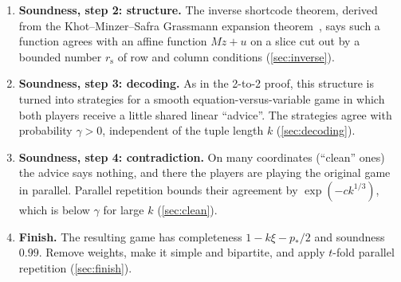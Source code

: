 \documentclass[11pt]{article}
\theoremstyle{definition}
\theoremstyle{remark}
\newcommand{\rs}{r_{\mathrm s}}
\begin{document}
\begin{enumerate}[leftmargin=*]
\item \textbf{Soundness, step 2: structure.} The inverse shortcode theorem,
  derived from the Khot--Minzer--Safra Grassmann expansion
  theorem~\cite{KMS23}, says such a function agrees with an affine function
  $Mz+u$ on a slice cut out by a bounded number $\rs$ of row and column
  conditions (\cref{sec:inverse}).

\item \textbf{Soundness, step 3: decoding.} As in the 2-to-2 proof, this
  structure is turned into strategies for a smooth equation-versus-variable
  game in which both players receive a little shared linear ``advice''. The
  strategies agree with probability $\gamma>0$, independent of the tuple
  length $k$ (\cref{sec:decoding}).

\item \textbf{Soundness, step 4: contradiction.} On many coordinates
  (``clean'' ones) the advice says nothing, and there the players are
  playing the original game in parallel. Parallel repetition bounds their
  agreement by $\exp(-ck^{1/3})$, which is below $\gamma$ for large $k$
  (\cref{sec:clean}).

\item \textbf{Finish.} The resulting game has completeness $1-k\xi-p_*/2$ and
  soundness $0.99$. Remove weights, make it simple and bipartite, and apply
  $t$-fold parallel repetition (\cref{sec:finish}).
\end{enumerate}
\end{document}
